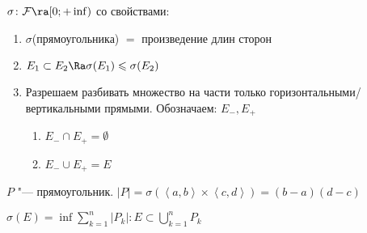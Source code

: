 \begin{Def}
	$\sigma\colon \mathcal{F} \ra [0; +\inf)$ со свойствами:
	\begin{enumerate}
	\item 
		$\sigma$(прямоугольника) $=$ произведение длин сторон

	\item 
		$E_1 \subset E_2 \Ra \sigma(E_1) \leqslant \sigma(E_2)$
	
	\item 
		Разрешаем разбивать множество на части только горизонтальными/вертикальными прямыми. Обозначаем: $E_{-}, E_{+}$
		\begin{enumerate}
			\item $E_{-} \cap E_{+} = \emptyset$
			\item $E_{-} \cup E_{+} = E$
		\end{enumerate}
	\end{enumerate} 
\end{Def}

\begin{Def}
	$P$ "--- прямоугольник. $|P| = \sigma(\left<a, b\right> \times \left<c, d\right>) = (b - a)(d - c)$
\end{Def}

\begin{Def}
	$\sigma(E) = \inf{\sum_{k = 1}^n |P_k|: E \subset \bigcup_{k = 1}^n P_k}$
\end{Def}

